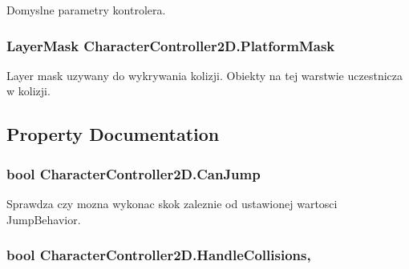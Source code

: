 Domyslne parametry kontrolera. 

\hypertarget{class_character_controller2_d_a239fc145e05e239c584bf7b1783b590e}{}
\subsubsection[{Platform\+Mask}]{\setlength{\rightskip}{0pt plus 5cm}Layer\+Mask Character\+Controller2\+D.\+Platform\+Mask}\label{class_character_controller2_d_a239fc145e05e239c584bf7b1783b590e}


Layer mask uzywany do wykrywania kolizji. Obiekty na tej warstwie uczestnicza w kolizji. 



\subsection{Property Documentation}
\hypertarget{class_character_controller2_d_a79855579d0cbd33e1ed08df1c513bb0f}{}
\subsubsection[{Can\+Jump}]{\setlength{\rightskip}{0pt plus 5cm}bool Character\+Controller2\+D.\+Can\+Jump\hspace{0.3cm}{\ttfamily [get]}}\label{class_character_controller2_d_a79855579d0cbd33e1ed08df1c513bb0f}


Sprawdza czy mozna wykonac skok zaleznie od ustawionej wartosci Jump\+Behavior. 

\hypertarget{class_character_controller2_d_aa693a23e691347cf526060141fad519e}{}
\subsubsection[{Handle\+Collisions}]{\setlength{\rightskip}{0pt plus 5cm}bool Character\+Controller2\+D.\+Handle\+Collisions\hspace{0.3cm}{\ttfamily [get]}, {\ttfamily [set]}}\label{class_character_controller2_d_aa693a23e691347cf526060141fad519e}


